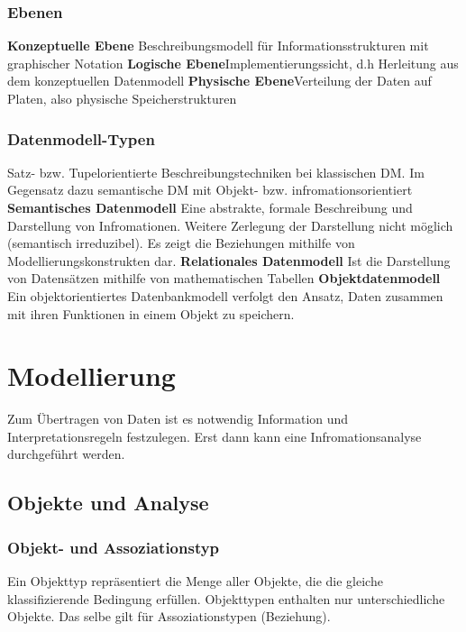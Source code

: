 \documentclass[a4paper,10pt]{scrartcl}
\begin{document}
\subsubsection{Ebenen}
\textbf{Konzeptuelle Ebene}\newline
Beschreibungsmodell für Informationsstrukturen mit graphischer Notation
\newline\textbf{Logische Ebene}\newline Implementierungssicht, d.h Herleitung aus dem konzeptuellen Datenmodell 
\newline\textbf{Physische Ebene}\newline Verteilung der Daten auf Platen, also physische Speicherstrukturen
\subsubsection{Datenmodell-Typen} 
Satz- bzw. Tupelorientierte Beschreibungstechniken bei klassischen DM.\newline
Im Gegensatz dazu semantische DM mit Objekt- bzw. infromationsorientiert
\newline\textbf{Semantisches Datenmodell}\newline
Eine abstrakte, formale Beschreibung und Darstellung von Infromationen. Weitere Zerlegung der Darstellung nicht möglich (semantisch irreduzibel). Es zeigt die Beziehungen mithilfe von Modellierungskonstrukten dar.
\newline\textbf{Relationales Datenmodell} \newline
Ist die Darstellung von Datensätzen mithilfe von mathematischen Tabellen
\newline\textbf{Objektdatenmodell}\newline
Ein objektorientiertes Datenbankmodell verfolgt den Ansatz, Daten zusammen mit ihren Funktionen in einem Objekt zu speichern.
\section{Modellierung}
Zum Übertragen von Daten ist es notwendig Information und Interpretationsregeln festzulegen. Erst dann kann eine Infromationsanalyse durchgeführt werden.  
\subsection{Objekte und Analyse}
\subsubsection{Objekt- und Assoziationstyp}
Ein Objekttyp repräsentiert die Menge aller Objekte, die die gleiche klassifizierende Bedingung erfüllen. 
Objekttypen enthalten nur unterschiedliche Objekte. Das selbe gilt für Assoziationstypen (Beziehung).
\end{document}
